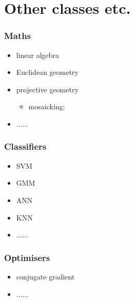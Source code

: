 \documentclass[landscape]{beamer}
\begin{document}
\section{Other classes etc.}


\begin{frame}[fragile]\frametitle{Maths}

  \begin{itemize}
  \item linear algebra
  \item Euclidean geometry
  \item projective geometry
    \begin{itemize}
    \item mosaicking:
      {\color{linkcolor} \setlength{\fboxrule}{1mm} }
    \end{itemize}
  \item ......
  \end{itemize}

\end{frame}

\begin{frame}[fragile]\frametitle{Classifiers}


  \begin{itemize}
  \item SVM
  \item GMM
  \item ANN
  \item KNN
  \item ......
  \end{itemize}

\end{frame}

\begin{frame}[fragile]\frametitle{Optimisers}

  \begin{itemize}
  \item conjugate gradient
  \item ......
  \end{itemize}

\end{frame}
\end{document}
